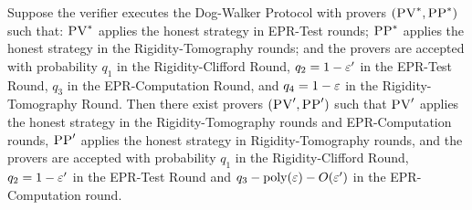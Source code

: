 \begin{lemma}\label{lem:PV-34}
Suppose the verifier executes the Dog-Walker Protocol with provers $(\textsc{PV}^*,\textsc{PP}^*)$ such that: $\textsc{PV}^*$ applies the honest strategy in EPR-Test rounds; 
$\textsc{PP}^*$ applies the honest strategy in the Rigidity-Tomography rounds; and the provers are accepted with probability $q_1$ in the Rigidity-Clifford Round, $q_2 = 1-\varepsilon'$ in the EPR-Test Round, $q_3$ in the EPR-Computation Round, and $q_4=1-\varepsilon$ in the Rigidity-Tomography Round. Then there exist provers $(\textsc{PV}',\textsc{PP}')$ such that $\textsc{PV}'$ applies the honest strategy in the Rigidity-Tomography rounds and EPR-Computation rounds, $\textsc{PP}'$ applies the honest strategy in Rigidity-Tomography rounds, and
the provers are accepted with probability $q_1$ in the Rigidity-Clifford Round, $q_2 = 1-\varepsilon'$ in the EPR-Test Round and $q_3-\mathrm{poly}(\varepsilon)-O(\varepsilon')$ in the EPR-Computation round. 
\end{lemma}

